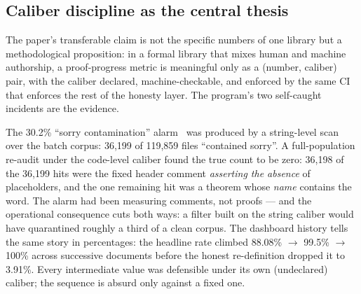 
\subsection{Caliber discipline as the central thesis}
\label{sec:thesis}
The paper's transferable claim is not the specific numbers of one
library but a methodological proposition: in a formal library
that mixes human and machine authorship, a proof-progress metric
is meaningful only as a (number, caliber) pair, with the caliber
declared, machine-checkable, and enforced by the same CI that
enforces the rest of the honesty layer. The program's two
self-caught incidents are the evidence.

The 30.2\% ``sorry contamination'' alarm~\cite{sylvasorryaudit2026}
was produced by a
string-level scan over the batch corpus: 36{,}199 of 119{,}859
files ``contained sorry''. A full-population re-audit under the
code-level caliber found the true count to be zero: 36{,}198 of
the 36{,}199 hits were the fixed header comment \emph{asserting
the absence} of placeholders, and the one remaining hit was a
theorem whose \emph{name} contains the word. The alarm had been
measuring comments, not proofs --- and the operational consequence
cuts both ways: a filter built on the string caliber would have
quarantined roughly a third of a clean corpus. The dashboard
history tells the same story in percentages: the headline rate
climbed 88.08\% $\to$ 99.5\% $\to$ 100\% across successive
documents before the honest re-definition dropped it to 3.91\%.
Every intermediate value was defensible under its own (undeclared)
caliber; the sequence is absurd only against a fixed one.

